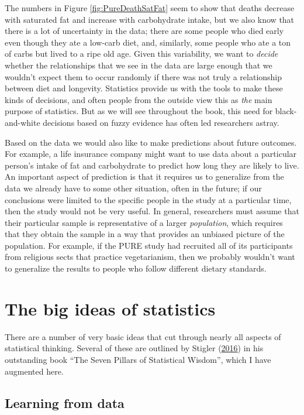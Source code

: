 \documentclass[12pt,]{book}
\theoremstyle{definition}
\theoremstyle{definition}
\theoremstyle{definition}
\theoremstyle{remark}
\begin{document}
The numbers in Figure \ref{fig:PureDeathSatFat} seem to show that deaths decrease with saturated fat and increase with carbohydrate intake, but we also know that there is a lot of uncertainty in the data; there are some people who died early even though they ate a low-carb diet, and, similarly, some people who ate a ton of carbs but lived to a ripe old age. Given this variability, we want to \emph{decide} whether the relationships that we see in the data are large enough that we wouldn't expect them to occur randomly if there was not truly a relationship between diet and longevity. Statistics provide us with the tools to make these kinds of decisions, and often people from the outside view this as \emph{the} main purpose of statistics. But as we will see throughout the book, this need for black-and-white decisions based on fuzzy evidence has often led researchers astray.

Based on the data we would also like to make predictions about future outcomes. For example, a life insurance company might want to use data about a particular person's intake of fat and carbohydrate to predict how long they are likely to live. An important aspect of prediction is that it requires us to generalize from the data we already have to some other situation, often in the future; if our conclusions were limited to the specific people in the study at a particular time, then the study would not be very useful. In general, researchers must assume that their particular sample is representative of a larger \emph{population}, which requires that they obtain the sample in a way that provides an unbiased picture of the population. For example, if the PURE study had recruited all of its participants from religious sects that practice vegetarianism, then we probably wouldn't want to generalize the results to people who follow different dietary standards.

\hypertarget{the-big-ideas-of-statistics}{%
\section{The big ideas of statistics}\label{the-big-ideas-of-statistics}}

There are a number of very basic ideas that cut through nearly all aspects of statistical thinking. Several of these are outlined by Stigler (\protect\hyperlink{ref-stig}{2016}) in his outstanding book ``The Seven Pillars of Statistical Wisdom'', which I have augmented here.

\hypertarget{learning-from-data}{%
\subsection{Learning from data}\label{learning-from-data}}
\end{document}
